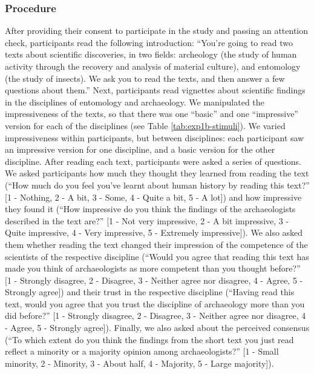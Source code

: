 \documentclass[
  english,
  doc,floatsintext]{apa6}
\begin{document}
\subsubsection{Procedure}\label{procedure-2}

After providing their consent to participate in the study and passing an attention check, participants read the following introduction: ``You're going to read two texts about scientific discoveries, in two fields: archeology (the study of human activity through the recovery and analysis of material culture), and entomology (the study of insects). We ask you to read the texts, and then answer a few questions about them.'' Next, participants read vignettes about scientific findings in the disciplines of entomology and archaeology. We manipulated the impressiveness of the texts, so that there was one ``basic'' and one ``impressive'' version for each of the disciplines (see Table \ref{tab:exp1b-stimuli}). We varied impressiveness within participants, but between disciplines: each participant saw an impressive version for one discipline, and a basic version for the other discipline. After reading each text, participants were asked a series of questions. We asked participants how much they thought they learned from reading the text (``How much do you feel you've learnt about human history by reading this text?'' {[}1 - Nothing, 2 - A bit, 3 - Some, 4 - Quite a bit, 5 - A lot{]}) and how impressive they found it (``How impressive do you think the findings of the archaeologists described in the text are?'' {[}1 - Not very impressive, 2 - A bit impressive, 3 - Quite impressive, 4 - Very impressive, 5 - Extremely impressive{]}). We also asked them whether reading the text changed their impression of the competence of the scientists of the respective discipline (``Would you agree that reading this text has made you think of archaeologists as more competent than you thought before?'' {[}1 - Strongly disagree, 2 - Disagree, 3 - Neither agree nor disagree, 4 - Agree, 5 - Strongly agree{]}) and their trust in the respective discipline (``Having read this text, would you agree that you trust the discipline of archaeology more than you did before?'' {[}1 - Strongly disagree, 2 - Disagree, 3 - Neither agree nor disagree, 4 - Agree, 5 - Strongly agree{]}). Finally, we also asked about the perceived consensus (``To which extent do you think the findings from the short text you just read reflect a minority or a majority opinion among archaeologists?'' {[}1 - Small minority, 2 - Minority, 3 - About half, 4 - Majority, 5 - Large majority{]}).
\end{document}
